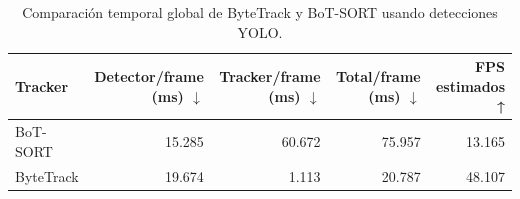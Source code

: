 \begin{table}
\caption{Comparación temporal global de ByteTrack y BoT-SORT usando detecciones YOLO.}
\label{tab:tracking_timing_global_yolo}
\begin{tabular}{lrrrr}
\toprule
Tracker & Detector/frame (ms) $\downarrow$ & Tracker/frame (ms) $\downarrow$ & Total/frame (ms) $\downarrow$ & FPS estimados ↑ \\
\midrule
BoT-SORT & 15.285 & 60.672 & 75.957 & 13.165 \\
ByteTrack & 19.674 & 1.113 & 20.787 & 48.107 \\
\bottomrule
\end{tabular}
\end{table}
